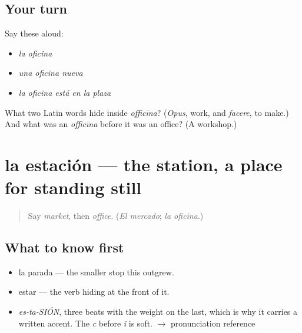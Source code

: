 \subsection*{Your turn}
Say these aloud:

\begin{itemize}
\raggedright
  \item \emph{la oficina}
  \item \emph{una oficina nueva}
  \item \emph{la oficina está en la plaza}
\end{itemize}

\begin{tcolorbox}[breakable,colback=teal!4,colframe=teal!35!black,title={Before you move on}]
What two Latin words hide inside \emph{officīna}? (\emph{Opus}, work, and \emph{facere}, to make.) And what was an \emph{officīna} before it was an office? (A workshop.)
\end{tcolorbox}
\section[la estación]{la estación — the station, a place for standing still}

\label{lesson:ES-C346-estacion}



\begin{quote}
Say \emph{market}, then \emph{office}. (\emph{El mercado}; \emph{la oficina}.)
\end{quote}

\subsection*{What to know first}
\begin{itemize}
\raggedright
  \item la parada — the smaller stop this outgrew.
  \item estar — the verb hiding at the front of it.
\end{itemize}

\begin{sounds}
\begin{itemize}
\raggedright
  \item \emph{es-ta-SIÓN}, three beats with the weight on the last, which is why it carries a written accent. The \emph{c} before \emph{i} is soft. $\to$ pronunciation reference
\end{itemize}
\end{sounds}

